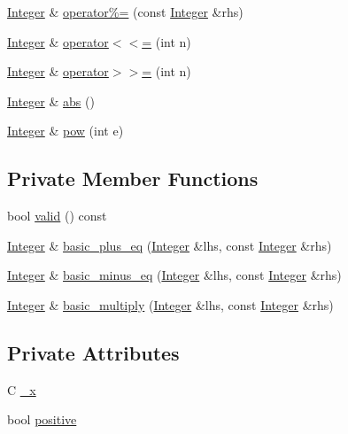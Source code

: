 \begin{DoxyCompactItemize}
\hyperlink{classInteger}{Integer} \& \hyperlink{classInteger_a5af44fd8bef5e32fa720b1262045f1b7}{operator\%=} (const \hyperlink{classInteger}{Integer} \&rhs)
\item 
\hyperlink{classInteger}{Integer} \& \hyperlink{classInteger_a4114e69e0da713f50f9cf946cfc70637}{operator$<$$<$=} (int n)
\item 
\hyperlink{classInteger}{Integer} \& \hyperlink{classInteger_a0fbada94834715ce6b91c39e5d41d24f}{operator$>$$>$=} (int n)
\item 
\hyperlink{classInteger}{Integer} \& \hyperlink{classInteger_a28b38b99580e4787e353c6630c3cf063}{abs} ()
\item 
\hyperlink{classInteger}{Integer} \& \hyperlink{classInteger_aae56deca12053a28469749c93c9f7343}{pow} (int e)
\end{DoxyCompactItemize}
\subsection*{Private Member Functions}
\begin{DoxyCompactItemize}
\item 
bool \hyperlink{classInteger_ace6a3dac75762d6c42b42285a426828c}{valid} () const 
\item 
\hyperlink{classInteger}{Integer} \& \hyperlink{classInteger_a4f6a1a192be1823e573f0c9975bfb90e}{basic\-\_\-plus\-\_\-eq} (\hyperlink{classInteger}{Integer} \&lhs, const \hyperlink{classInteger}{Integer} \&rhs)
\item 
\hyperlink{classInteger}{Integer} \& \hyperlink{classInteger_abed10960783ba6d7ea6cf483e908c5ad}{basic\-\_\-minus\-\_\-eq} (\hyperlink{classInteger}{Integer} \&lhs, const \hyperlink{classInteger}{Integer} \&rhs)
\item 
\hyperlink{classInteger}{Integer} \& \hyperlink{classInteger_a7bad07a291c7e01a17b7a057afd3b212}{basic\-\_\-multiply} (\hyperlink{classInteger}{Integer} \&lhs, const \hyperlink{classInteger}{Integer} \&rhs)
\end{DoxyCompactItemize}
\subsection*{Private Attributes}
\begin{DoxyCompactItemize}
\item 
C \hyperlink{classInteger_a19f83aa8d5d86634885eb63d15bcdb6d}{\-\_\-x}
\item 
bool \hyperlink{classInteger_af0750e482d739e0d2ebb7185c6b22fc2}{positive}
\end{DoxyCompactItemize}
